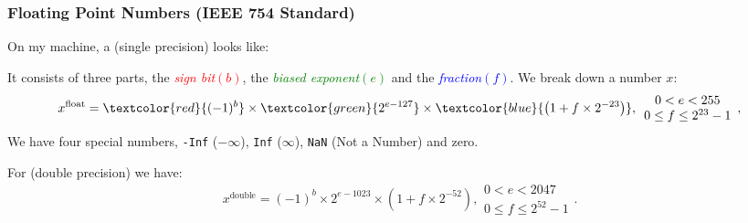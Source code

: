 \documentclass[smaller,handout,table]{beamer}
\begin{document}
\begin{frame}
\frametitle{Floating Point Numbers (IEEE 754 Standard)}
On my machine, a  (single precision) looks like:\\
\begin{center}
\end{center}
It consists of three parts, the \textcolor{red}{\emph{sign bit}$(b)$}, the \textcolor{green}{\emph{biased exponent}$(e)$} and the \textcolor{blue}{\emph{fraction}$(f)$}.
We break down a number $x$:
$$x^{\textrm{float}} = \textcolor{red}{(-1)^b} \times 
\textcolor{green}{2^{e-127}} \times \textcolor{blue}{\left(1+f\times2^{-23}\right)},
\begin{array}{c}
0 < e < 255\\0 \leq f \leq 2^{23}-1
\end{array},$$
We have four special numbers, {\tt -Inf} ($-\infty$), {\tt Inf} ($\infty$), {\tt NaN} (Not a Number) and zero.

For  (double precision) we have:
$$x^{\textrm{double}} = (-1)^b\times 2^{e-1023}\times\left(1+f\times2^{-52}\right),
\begin{array}{c}
0 < e < 2047\\0 \leq f \leq 2^{52}-1
\end{array}.$$
\end{frame}
\end{document}
